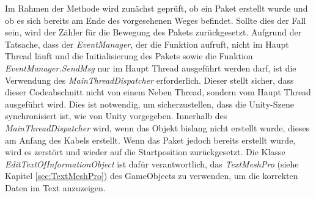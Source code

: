 Im Rahmen der Methode wird zunächst geprüft, ob ein Paket erstellt wurde und ob es sich bereits am Ende des vorgesehenen Weges befindet. Sollte dies der Fall sein, wird der Zähler für die Bewegung des Pakets zurückgesetzt. Aufgrund der Tatsache, dass der \textit{EventManager}, der die Funktion aufruft, nicht im Haupt Thread läuft und die Initialisierung des Pakets sowie die Funktion \textit{EventManager.SendMsg} nur im Haupt Thread ausgeführt werden darf, ist die Verwendung des \textit{MainThreadDispatcher} erforderlich. Dieser stellt sicher, dass dieser Codeabschnitt nicht von einem Neben Thread, sondern vom Haupt Thread ausgeführt wird. Dies ist notwendig, um sicherzustellen, dass die Unity-Szene synchronisiert ist, wie von Unity vorgegeben. Innerhalb des \textit{MainThreadDispatcher} wird, wenn das Objekt bislang nicht erstellt wurde, dieses am Anfang des Kabels erstellt. Wenn das Paket jedoch bereits erstellt wurde, wird es zerstört und wieder auf die Startposition zurückgesetzt. Die Klasse \textit{EditTextOfInformationObject} ist dafür verantwortlich, das \textit{TextMeshPro} (siehe Kapitel \ref{sec:TextMeshPro}) des GameObjects zu verwenden, um die korrekten Daten im Text anzuzeigen.



